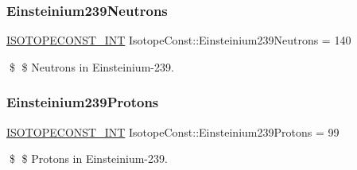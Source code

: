 \subsubsection{\texorpdfstring{Einsteinium239\+Neutrons}{Einsteinium239Neutrons}}
{\footnotesize\ttfamily \mbox{\hyperlink{group___isotope_const-_macros_ga5f18360b3e99483a35c32d789e62621c}{I\+S\+O\+T\+O\+P\+E\+C\+O\+N\+S\+T\+\_\+\+I\+NT}} Isotope\+Const\+::\+Einsteinium239\+Neutrons = 140}

\$ \$ Neutrons in Einsteinium-\/239. \mbox{\label{group___isotope_const-_einsteinium-_es239_ga8b52ec90ebca8e7748d8ba59749f8d4d}} 
\subsubsection{\texorpdfstring{Einsteinium239\+Protons}{Einsteinium239Protons}}
{\footnotesize\ttfamily \mbox{\hyperlink{group___isotope_const-_macros_ga5f18360b3e99483a35c32d789e62621c}{I\+S\+O\+T\+O\+P\+E\+C\+O\+N\+S\+T\+\_\+\+I\+NT}} Isotope\+Const\+::\+Einsteinium239\+Protons = 99}

\$ \$ Protons in Einsteinium-\/239. 